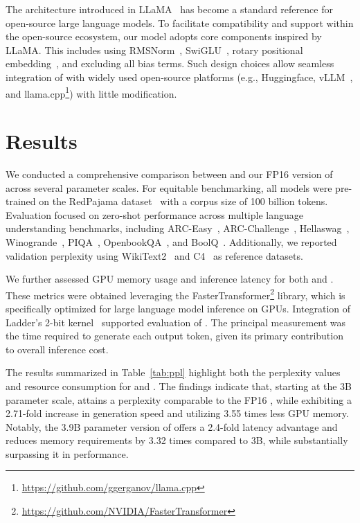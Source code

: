 The architecture introduced in LLaMA~\cite{llama, llama2} has become a standard reference for open-source large language models. To facilitate compatibility and support within the open-source ecosystem, our  model adopts core components inspired by LLaMA. This includes using RMSNorm~\cite{rmsnorm}, SwiGLU~\cite{swiglu}, rotary positional embedding~\cite{rope}, and excluding all bias terms. Such design choices allow seamless integration of  with widely used open-source platforms (e.g., Huggingface, vLLM~\cite{vllm}, and llama.cpp\footnote{\url{https://github.com/ggerganov/llama.cpp}}) with little modification.

\section{Results}

We conducted a comprehensive comparison between  and our FP16 version of  across several parameter scales. For equitable benchmarking, all models were pre-trained on the RedPajama dataset~\cite{redpajama} with a corpus size of 100 billion tokens. Evaluation focused on zero-shot performance across multiple language understanding benchmarks, including ARC-Easy~\cite{arc}, ARC-Challenge~\cite{arc}, Hellaswag~\cite{hellaswag}, Winogrande~\cite{winoGrande}, PIQA~\cite{piqa}, OpenbookQA~\cite{openbookqa}, and BoolQ~\cite{boolq}. Additionally, we reported validation perplexity using WikiText2~\cite{wikitext2} and C4~\cite{c4} as reference datasets.

We further assessed GPU memory usage and inference latency for both  and . These metrics were obtained leveraging the FasterTransformer\footnote{\url{https://github.com/NVIDIA/FasterTransformer}} library, which is specifically optimized for large language model inference on GPUs. Integration of Ladder's 2-bit kernel~\cite{ladder} supported evaluation of . The principal measurement was the time required to generate each output token, given its primary contribution to overall inference cost.

The results summarized in Table~\ref{tab:ppl} highlight both the perplexity values and resource consumption for  and . The findings indicate that, starting at the 3B parameter scale,  attains a perplexity comparable to the FP16 , while exhibiting a 2.71-fold increase in generation speed and utilizing 3.55 times less GPU memory. Notably, the 3.9B parameter version of  offers a 2.4-fold latency advantage and reduces memory requirements by 3.32 times compared to  3B, while substantially surpassing it in performance.

